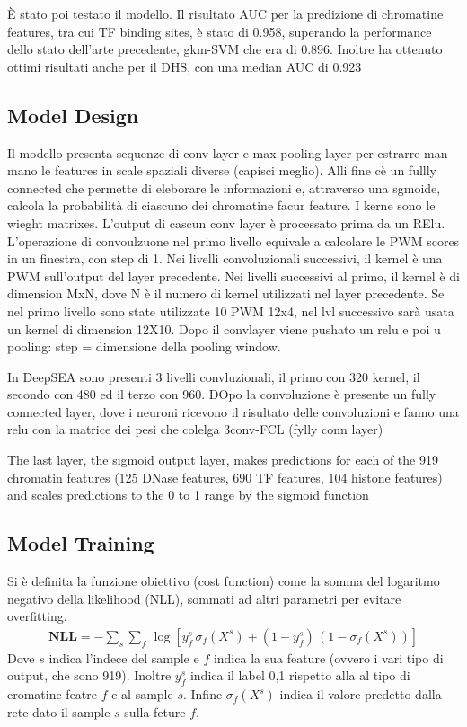 È stato poi testato il modello. Il risultato AUC per la predizione di chromatine features, tra cui TF binding sites, è stato di 0.958, superando la performance dello stato dell'arte precedente, gkm-SVM che era di 0.896. Inoltre ha ottenuto ottimi risultati anche per il DHS, con una median AUC di 0.923


\subsection*{Model Design}
Il modello presenta sequenze di conv layer e max pooling layer per estrarre man mano le features in scale spaziali diverse (capisci meglio). Alli fine cè un fullly connected che permette di eleborare le informazioni e, attraverso una sgmoide, calcola la probabilità di ciascuno dei chromatine facur feature. I kerne sono le wieght matrixes. L'output di cascun conv layer è processato prima da un RElu. L'operazione di convoulzuone nel primo livello equivale a calcolare le PWM scores in un finestra, con step di 1. Nei livelli convoluzionali successivi, il kernel è una PWM sull'output del layer precedente. 
Nei livelli successivi al primo, il kernel è di dimension MxN, dove N è il numero di kernel utilizzati nel layer precedente. Se nel primo livello sono state utilizzate 10 PWM 12x4, nel lvl successivo sarà usata un kernel di dimension 12X10. Dopo il convlayer viene pushato un relu e poi u pooling: step = dimensione della pooling window.

In DeepSEA sono presenti 3 livelli convluzionali, il primo con 320 kernel, il secondo con 480 ed il terzo con 960. DOpo la convoluzione è presente un fully connected layer, dove i neuroni ricevono il risultato delle convoluzioni e fanno una relu con la matrice dei pesi che colelga 3conv-FCL (fylly conn layer)

The last layer, the sigmoid output layer, makes predictions for each of the 919 chromatin features (125 DNase features, 690 TF features, 104 histone features) and scales predictions to the 0 to 1 range by the sigmoid function

\subsection*{Model Training}
Si è definita la funzione obiettivo (cost function) come la somma del logaritmo negativo della likelihood (NLL), sommati ad altri parametri per evitare overfitting.
% 
\begin{gather*}
    \mathbf{NLL} = - \sum_s \sum_f\, \log\left[ y_f^s\,\sigma_f\left(X^s\right)  + \left( 1- y_f^s \right) \, \left(1 - \sigma_f\left(X^s\right) \right) \right]
\end{gather*}
% 
Dove $s$ indica l'indece del sample e $f$ indica la sua feature (ovvero i vari tipo di output, che sono 919). Inoltre $y_f^s$ indica il label 0,1 rispetto alla al tipo di cromatine featre $f$ e al sample $s$. Infine $\sigma_f\left(X^s\right)$ indica il valore predetto dalla rete dato il sample $s$ sulla feture $f$.

